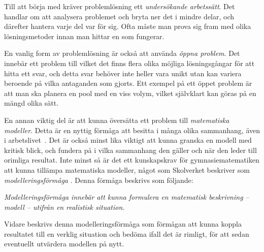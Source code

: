 
\textcolor{lila}{
    Till att börja med kräver problemlösning ett \textsl{undersökande arbetssätt}. Det handlar om att analysera problemet och bryta ner det i mindre delar, och därefter hantera varje del var för sig. Ofta måste man prova sig fram med olika lösningsmetoder innan man hittar en som fungerar.
}
        
\textcolor{lila}{
    En vanlig form av problemlösning är också att använda \textsl{öppna problem}. Det innebär ett  problem till vilket det finns flera olika möjliga lösningsgångar för att hitta ett svar, och detta svar behöver inte heller vara unikt utan kan variera beroende på vilka antaganden som gjorts. Ett exempel på ett öppet problem är att man ska planera en pool med en viss volym, vilket självklart kan göras på en mängd olika sätt.
}

\textcolor{lila}{
    En annan viktig del är att kunna översätta ett problem till \textsl{matematiska modeller}. Detta är en nyttig förmåga att besitta i många olika sammanhang, även i arbetslivet~\cite{TheElephant}. Det är också minst lika viktigt att kunna granska en modell med kritisk blick, och fundera på i vilka sammanhang den gäller och när den leder till orimliga resultat.
}
\textcolor{Mahogany}{Inte minst så är det ett kunskapskrav för gymnasiematematiken att kunna tillämpa matematiska modeller, något som Skolverket beskriver som \textsl{modelleringsförmåga} \cite{ProblemDef} \cite{skolverketMatte}. Denna förmåga beskrivs som följande:}

\begin{displayquote}
    \textcolor{Mahogany}{
        \textsl{Modelleringsförmåga innebär att kunna formulera en matematisk beskrivning – modell – utifrån en realistisk situation.}
    }
\end{displayquote}
\noindent\textcolor{Mahogany}{Vidare beskrivs denna modelleringsförmåga som förmågan att kunna koppla resultatet till en verklig situation och bedöma ifall det är rimligt, för att sedan eventuellt utvärdera modellen på nytt.}